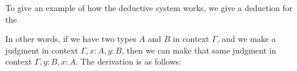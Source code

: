 \begin{eg}
To give an example of how the deductive system works, we give a deduction for the 
\begin{prooftree}
\end{prooftree}
In other words, if we have two types $A$ and $B$ in context $\Gamma$, and we make a judgment in context $\Gamma,x:A,y:B$, then we can make that same judgment in context $\Gamma,y:B,x:A$.
The derivation is as follows:
\begin{small}
\begin{prooftree}
\end{prooftree}
\end{small}
\end{eg}


\begin{comment}
For $A\in T_n$ we define $T_{n+k+1}(A):= \{B\in T_{n+k}\mid \mathrm{ft}^{k+1}(B)=A\}$. Similarly we define $\tilde{T}_{n+k+1}(A):=\{b\in\tilde{T}_{n+k+1}\mid\mathrm{ft}^{k+1}(\partial(b))=A\}$. For any closed type $A$ we maintain the convention that $T_{k}(\mathrm{ft}(A)):= T_k$.
\begin{enumerate}
\item For all $A\in T_n$, and all $k\in\N$, \define{weakening} operations
\begin{align*}
W_A & : T_{n+k}(\mathrm{ft}(A)) \to T_{n+k+1}(A) \\
\tilde{W}_A & : \tilde{T}_{n+k}(\mathrm{ft}(A))\to \tilde{T}_{n+k+1}(A)
\end{align*}
subject to the conditions $\mathrm{ft}(W_A(B))=W_A(\mathrm{ft}(B))$ if $B\in T_{n+k}$ with $k\geq 1$, and $\partial(\tilde{W}_A(b))=W_A(\partial(b))$.
\item For all $A\in T_n$ a term $\delta_A\in \tilde{T}_{n+1}$ satisfying $\partial(\delta_A)=W_A(A)$. 
\item For all $a\in \tilde{T}_n$ satisfying $\partial(a)=A$, and all $k\in\N$, \define{substitution} operations
\begin{align*}
S_a & : \{B\in T_{n+k+1}\mid \mathrm{ft}^{k+1}(B)= A\}\to T_k \\
\tilde{S}_a & : \{b\in \tilde{T}_{n+k+1}\mid \mathrm{ft}^{k+1}(\partial(b))=A\}\to \tilde{T}_{n+k}
\end{align*}
subject to the conditions $\mathrm{ft}(S_a(B))=\mathrm{ft}(A)$ if $B\in T_{n+1}$, $\mathrm{ft}(S_a(B))=S_a(\mathrm{ft}(B))$ if $B\in T_{n+k+1}$ with $k\geq 1$, and $\partial(\tilde{S}_a(b))=S_a(\partial(b))$.
\end{enumerate}
\end{comment}

